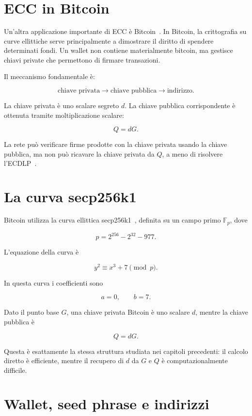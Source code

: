 \documentclass[12pt,a4paper,oneside]{report}
\begin{document}
\section{ECC in Bitcoin}

Un'altra applicazione importante di ECC è Bitcoin~\cite{margara_bitcoin,nakamoto_bitcoin}. In Bitcoin, la crittografia su curve ellittiche serve principalmente a dimostrare il diritto di spendere determinati fondi. Un wallet non contiene materialmente bitcoin, ma gestisce chiavi private che permettono di firmare transazioni.

Il meccanismo fondamentale è:

\[
\text{chiave privata}
\longrightarrow
\text{chiave pubblica}
\longrightarrow
\text{indirizzo}.
\]

La chiave privata è uno scalare segreto \(d\). La chiave pubblica corrispondente è ottenuta tramite moltiplicazione scalare:

\[
Q=dG.
\]

La rete può verificare firme prodotte con la chiave privata usando la chiave pubblica, ma non può ricavare la chiave privata da \(Q\), a meno di risolvere l'ECDLP~\cite{margara_bitcoin,sec1}.

\section{La curva secp256k1}

Bitcoin utilizza la curva ellittica secp256k1~\cite{margara_bitcoin,sec2}, definita su un campo primo \(\mathbb{F}_p\), dove

\[
p = 2^{256} - 2^{32} - 977.
\]

L'equazione della curva è

\[
y^2 \equiv x^3 + 7 \pmod p.
\]

In questa curva i coefficienti sono

\[
a=0, \qquad b=7.
\]

Dato il punto base \(G\), una chiave privata Bitcoin è uno scalare \(d\), mentre la chiave pubblica è

\[
Q=dG.
\]

Questa è esattamente la stessa struttura studiata nei capitoli precedenti: il calcolo diretto è efficiente, mentre il recupero di \(d\) da \(G\) e \(Q\) è computazionalmente difficile.

\section{Wallet, seed phrase e indirizzi}
\end{document}
